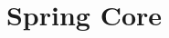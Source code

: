 \documentclass[a4paper,10pt]{article}
\begin{document}
\title{Spring Core}
\maketitle

\pagebreak
\end{document}
